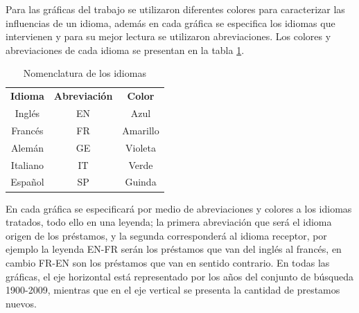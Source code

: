



Para las gráficas del trabajo se utilizaron diferentes colores para
caracterizar las influencias de un idioma, además en cada gráfica se especifica los idiomas que intervienen y para su mejor lectura se utilizaron abreviaciones. Los colores y abreviaciones de cada idioma se presentan  en la tabla \ref{tab.idcolor}.

\begin{table} %
	\centering
	\begin{tabular}{ccc}
		\textbf{Idioma} & \textbf{Abreviación} & \textbf{Color} \\
		Inglés          & EN                   & Azul           \\
		Francés         & FR                   & Amarillo       \\
		Alemán          & GE                   & Violeta        \\
		Italiano        & IT                   & Verde          \\
		Español         & SP                   & Guinda        
	\end{tabular}
	\caption{Nomenclatura de los idiomas}
	\label{tab.idcolor}
\end{table} %

En cada gráfica se especificará por medio de  abreviaciones y  colores a los
idiomas tratados, todo ello en una leyenda; la primera abreviación que será el
idioma origen de los préstamos, y la segunda corresponderá al idioma receptor,
por ejemplo  la leyenda EN-FR serán los préstamos que van del inglés al
francés, en cambio FR-EN son los préstamos que van en sentido contrario.
En todas las gráficas, el eje horizontal está representado por los años del
conjunto de búsqueda 1900-2009,  mientras que en el eje vertical se presenta la
cantidad de prestamos nuevos. 


